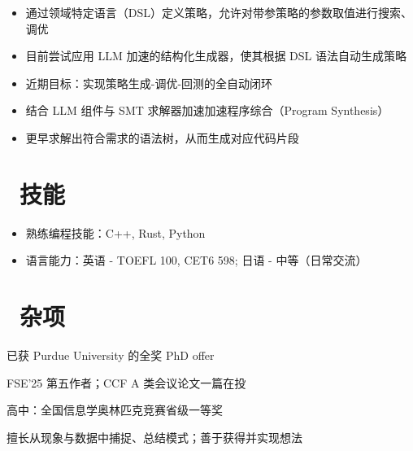 \documentclass{compact_resume}
\begin{document}
\begin{itemize}[parsep=0.5ex]
  \item 通过领域特定语言（DSL）定义策略，允许对带参策略的参数取值进行搜索、调优
  \item 目前尝试应用 LLM 加速的结构化生成器，使其根据 DSL 语法自动生成策略
  \item 近期目标：实现策略生成-调优-回测的全自动闭环
\end{itemize}

\begin{itemize}[parsep=0.5ex]
  \item 结合 LLM 组件与 SMT 求解器加速加速程序综合（Program Synthesis）
  \item 更早求解出符合需求的语法树，从而生成对应代码片段
\end{itemize}

\section{\faCogs\ 技能}
\begin{itemize}[parsep=0.5ex]
  \item 熟练编程技能：C++, Rust, Python
  \item 语言能力：英语 - TOEFL 100, CET6 598; 日语 - 中等（日常交流）
\end{itemize}

\section{\faInfo\ 杂项}
\begin{description}[parsep=0.5ex]
  \item[升学] 已获 Purdue University 的全奖 PhD offer
  \item[论文] FSE'25 第五作者；CCF A 类会议论文一篇在投
  \item[竞赛] 高中：全国信息学奥林匹克竞赛省级一等奖
  \item[特长] 擅长从现象与数据中捕捉、总结模式；善于获得并实现想法
\end{description}
\end{document}
